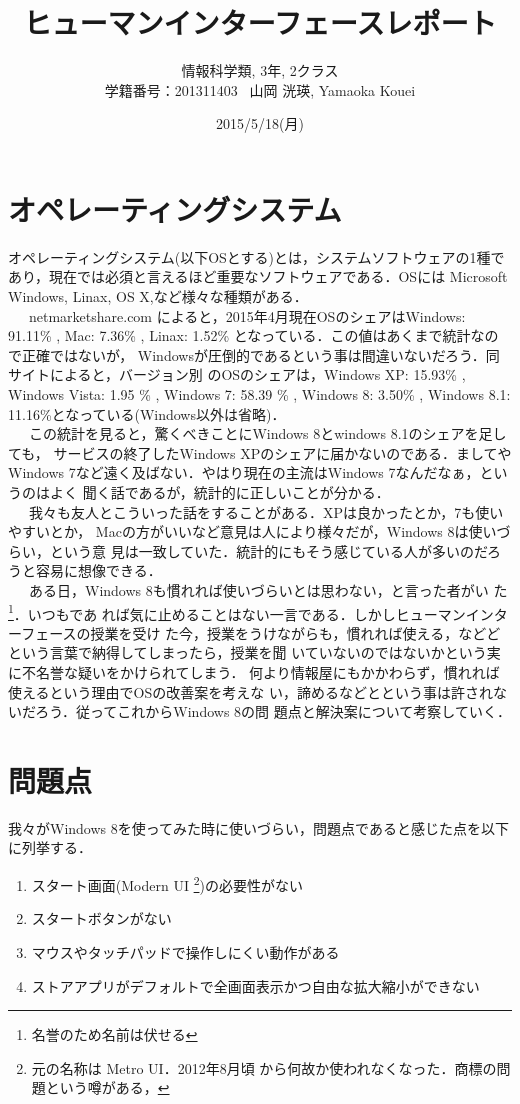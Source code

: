 \documentclass[a4j]{jarticle}
\title{ヒューマンインターフェースレポート}
\author{情報科学類, 3年, 2クラス\\ 学籍番号：201311403 \ 山岡 洸瑛, Yamaoka
Kouei}
\date{2015/5/18(月)}
\begin{document}
\begin{titlepage}
 \maketitle
\end{titlepage}

\section*{オペレーティングシステム}
オペレーティングシステム(以下OSとする)とは，システムソフトウェアの1種で
あり，現在では必須と言えるほど重要なソフトウェアである．OSには
Microsoft Windows, Linax, OS X,など様々な種類がある．\\ \ \ \ netmarketshare.com
によると，2015年4月現在OSのシェアはWindows: 91.11\% , Mac: 7.36\% , Linax:
1.52\% となっている．この値はあくまで統計なので正確ではないが，
Windowsが圧倒的であるという事は間違いないだろう．同サイトによると，バージョン別
のOSのシェアは，Windows XP: 15.93\% , Windows Vista: 1.95 \% , Windows 7: 58.39 \% , Windows 8:
3.50\% , Windows 8.1: 11.16\%となっている(Windows以外は省略)．\\\ \ \ 
この統計を見ると，驚くべきことにWindows 8とwindows 8.1のシェアを足しても，
サービスの終了したWindows XPのシェアに届かないのである．ましてやWindows
7など遠く及ばない．やはり現在の主流はWindows 7なんだなぁ，というのはよく
聞く話であるが，統計的に正しいことが分かる．\\\ \ \ 
我々も友人とこういった話をすることがある．XPは良かったとか，7も使いやすいとか，
Macの方がいいなど意見は人により様々だが，Windows 8は使いづらい，という意
見は一致していた．統計的にもそう感じている人が多いのだろうと容易に想像できる．
\\\ \ \ ある日，Windows 8も慣れれば使いづらいとは思わない，と言った者がい
た\footnote{名誉のため名前は伏せる}．いつもであ
れば気に止めることはない一言である．しかしヒューマンインターフェースの授業を受け
た今，授業をうけながらも，慣れれば使える，などどという言葉で納得してしまったら，授業を聞
いていないのではないかという実に不名誉な疑いをかけられてしまう．
何より情報屋にもかかわらず，慣れれば使えるという理由でOSの改善案を考えな
い，諦めるなどとという事は許されないだろう．従ってこれからWindows 8の問
題点と解決案について考察していく．

\section*{問題点}
我々がWindows 8を使ってみた時に使いづらい，問題点であると感じた点を以下に列挙する．
\begin{enumerate}
 \item スタート画面(Modern UI \footnote{元の名称は Metro UI．2012年8月頃
       から何故か使われなくなった．商標の問題という噂がある，})の必要性がない
 \item スタートボタンがない
 \item マウスやタッチパッドで操作しにくい動作がある
 \item ストアアプリがデフォルトで全画面表示かつ自由な拡大縮小ができない
\end{enumerate}
\end{document}
